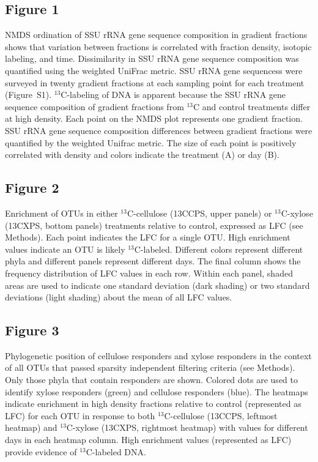 \subsection{Figure 1}
NMDS ordination of SSU rRNA gene sequence composition in
gradient fractions shows that variation between fractions is
correlated with fraction density, isotopic labeling, and
time. Dissimilarity in SSU rRNA gene sequence composition was quantified using the 
weighted UniFrac metric. SSU rRNA gene sequencess were surveyed in twenty
gradient fractions at each sampling point for each treatment (Figure~S1).
$^{13}$C-labeling of DNA is apparent because the SSU rRNA gene sequence composition of
gradient fractions from $^{13}$C and control treatments differ at high density.
Each point on the NMDS plot represents one gradient fraction.  SSU rRNA gene sequence
composition differences between gradient fractions were quantified by the
weighted Unifrac metric. The size of each point is positively correlated with
density and colors indicate the treatment (A) or day (B).
\subsection{Figure 2}
Enrichment of OTUs in either $^{13}$C-cellulose (13CCPS, upper panels) or
$^{13}$C-xylose (13CXPS, bottom panels) treatments relative to control,
expressed as LFC (see Methods). Each point indicates the LFC for a single OTU.
High enrichment values indicate an OTU is likely $^{13}$C-labeled. Different
colors represent different phyla and different panels represent different days.
The final column shows the frequency distribution of LFC values in each row.
Within each panel, shaded areas are used to indicate one standard deviation
(dark shading) or two standard deviations (light shading) about the mean of all
LFC values.
\subsection{Figure 3}
Phylogenetic position of cellulose responders and xylose responders in the
context of all OTUs that passed sparsity independent filtering criteria (see
Methods). Only those phyla that contain responders are shown.  Colored dots are
used to identify xylose responders (green) and cellulose responders (blue). The
heatmaps indicate enrichment in high density fractions relative to control
(represented as LFC) for each OTU in response to both $^{13}$C-cellulose
(13CCPS, leftmost heatmap) and $^{13}$C-xylose (13CXPS, rightmost heatmap) with
values for different days in each heatmap column. High enrichment values
(represented as LFC) provide evidence of $^{13}$C-labeled DNA.  

